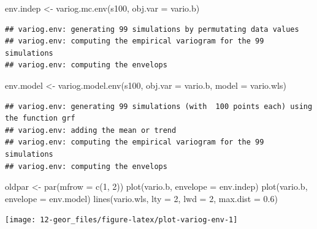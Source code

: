 \documentclass[
  spanish,
]{book}
\newenvironment{Shaded}{\begin{snugshade}}{\end{snugshade}}
\newcommand{\AttributeTok}[1]{\textcolor[rgb]{0.77,0.63,0.00}{#1}}
\newcommand{\DecValTok}[1]{\textcolor[rgb]{0.00,0.00,0.81}{#1}}
\newcommand{\FloatTok}[1]{\textcolor[rgb]{0.00,0.00,0.81}{#1}}
\newcommand{\FunctionTok}[1]{\textcolor[rgb]{0.00,0.00,0.00}{#1}}
\newcommand{\NormalTok}[1]{#1}
\newcommand{\OtherTok}[1]{\textcolor[rgb]{0.56,0.35,0.01}{#1}}
\theoremstyle{break}
\begin{document}
\begin{Shaded}
\begin{Highlighting}[]
\NormalTok{env.indep }\OtherTok{\textless{}{-}} \FunctionTok{variog.mc.env}\NormalTok{(s100, }\AttributeTok{obj.var =}\NormalTok{ vario.b)}
\end{Highlighting}
\end{Shaded}

\begin{verbatim}
## variog.env: generating 99 simulations by permutating data values
## variog.env: computing the empirical variogram for the 99 simulations
## variog.env: computing the envelops
\end{verbatim}

\begin{Shaded}
\begin{Highlighting}[]
\NormalTok{env.model }\OtherTok{\textless{}{-}} \FunctionTok{variog.model.env}\NormalTok{(s100, }\AttributeTok{obj.var =}\NormalTok{ vario.b, }\AttributeTok{model =}\NormalTok{ vario.wls)}
\end{Highlighting}
\end{Shaded}

\begin{verbatim}
## variog.env: generating 99 simulations (with  100 points each) using the function grf
## variog.env: adding the mean or trend
## variog.env: computing the empirical variogram for the 99 simulations
## variog.env: computing the envelops
\end{verbatim}

\begin{Shaded}
\begin{Highlighting}[]
\NormalTok{oldpar }\OtherTok{\textless{}{-}} \FunctionTok{par}\NormalTok{(}\AttributeTok{mfrow =} \FunctionTok{c}\NormalTok{(}\DecValTok{1}\NormalTok{, }\DecValTok{2}\NormalTok{))}
\FunctionTok{plot}\NormalTok{(vario.b, }\AttributeTok{envelope =}\NormalTok{ env.indep)}
\FunctionTok{plot}\NormalTok{(vario.b, }\AttributeTok{envelope =}\NormalTok{ env.model)}
\FunctionTok{lines}\NormalTok{(vario.wls, }\AttributeTok{lty =} \DecValTok{2}\NormalTok{, }\AttributeTok{lwd =} \DecValTok{2}\NormalTok{, }\AttributeTok{max.dist =} \FloatTok{0.6}\NormalTok{)}
\end{Highlighting}
\end{Shaded}

\begin{center}\texttt{[image: 12-geor\_files/figure-latex/plot-variog-env-1]} \end{center}
\end{document}
